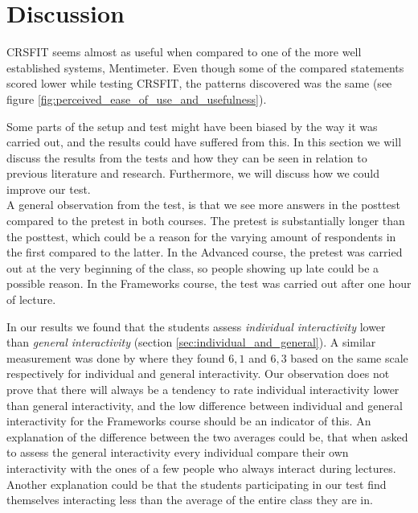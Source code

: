 \section{Discussion}





CRSFIT seems almost as useful when compared to one of the more well established systems, Mentimeter. Even though some of the compared statements scored lower while testing CRSFIT, the patterns discovered was the same (see figure \ref{fig:perceived_ease_of_use_and_usefulness}).


Some parts of the setup and test might have been biased by the way it was carried out, and the results could have suffered from this. In this section we will discuss the results from the tests and how they can be seen in relation to previous literature and research. Furthermore, we will discuss how we could improve our test. \\



A general observation from the test, is that we see more answers in the posttest compared to the pretest in both courses. The pretest is substantially longer than the posttest, which could be a reason for the varying amount of respondents in the first compared to the latter. In the Advanced course, the pretest was carried out at the very beginning of the class, so people showing up late could be a possible reason. In the Frameworks course, the test was carried out after one hour of lecture.


In our results we found that the students assess \emph{individual interactivity} lower than \emph{general interactivity} (section \ref{sec:individual_and_general}). A similar measurement was done by  where they found $6,1$ and $6,3$ based on the same scale respectively for individual and general interactivity. Our observation does not prove that there will always be a tendency to rate individual interactivity lower than general interactivity, and the low difference between individual and general interactivity for the Frameworks course should be an indicator of this. An explanation of the difference between the two averages could be, that when asked to assess the general interactivity every individual compare their own interactivity with the ones of a few people who always interact during lectures. Another explanation could be that the students participating in our test find themselves interacting less than the average of the entire class they are in.




